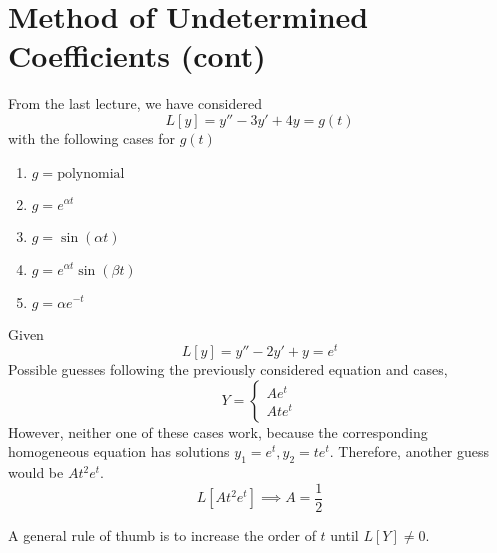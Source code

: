 \documentclass[twoside]{report}
\begin{document}
    \section{Method of Undetermined Coefficients (cont)}
    From the last lecture, we have considered
    \begin{equation}
        L[y] = y'' - 3y' + 4y = g(t)
    \end{equation}
    with the following cases for $g(t)$
    \begin{multicols}{3}
        \begin{enumerate}
            \item $g = \text{polynomial}$
            \item $g = e^{\alpha t}$
            \item $g = \sin(\alpha t)$
            \item $g = e^{\alpha t}\sin(\beta t)$
            \item $g = \alpha e^{-t}$
        \end{enumerate}
    \end{multicols}
    \begin{example}
        Given
        \begin{equation}
            L[y] = y'' -2y' + y = e^{t}
        \end{equation}
        Possible guesses following the previously considered equation and cases,
        \begin{equation}
            Y = \begin{cases}
                Ae^{t}\\
                Ate^{t}
            \end{cases}
        \end{equation}
        However, neither one of these cases work, because the corresponding homogeneous equation has solutions $y_{1} = e^{t}, y_{2} = te^{t}$. Therefore, another guess would be $At^{2}e^{t}$.
        \begin{equation}
            L[At^{2}e^{t}] \implies A = \frac{1}{2}
        \end{equation}
    \end{example}
    A general rule of thumb is to increase the order of $t$ until $L[Y] \neq 0$.
    \np
\end{document}
